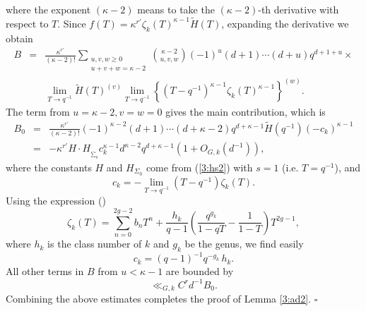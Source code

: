 \documentclass[12pt]{amsart}
\theoremstyle{plain}
\begin{document}
where the exponent $(\kappa-2)$ means to take the $(\kappa-2)$-th derivative with respect to $T$. Since $f(T)=\kappa^{r'} \zeta_k(T)^{\kappa-1} \widetilde{H}(T)$, expanding the derivative we obtain
\begin{eqnarray*} B&=&\frac{\kappa^{r'}}{(\kappa-2)!} \sum_{\substack{u,v,w \ge 0\\
u+v+w=\kappa-2}} \binom{\kappa-2}{u,v,w}(-1)^u(d+1) \cdots (d+u) q^{d+1+u} \times \\
&&\lim_{T \to q^{-1}}\widetilde{H}(T)^{(v)} \lim_{T \to q^{-1}} \left\{ (T-q^{-1})^{\kappa-1} \zeta_k(T)^{\kappa-1} \right\}^{(w)}. \end{eqnarray*}
The term from $u=\kappa-2,v=w=0$ gives the main contribution, which is
\begin{eqnarray*} B_0 &=& \frac{\kappa^{r'}}{(\kappa-2)!} (-1)^{\kappa-2}(d+1) \cdots (d+\kappa-2) q^{d+\kappa-1} \widetilde{H}(q^{-1}) (-c_k)^{\kappa-1}\\
&=& -\kappa^{r'} H \cdot H_{_{\sum_0}}c_k^{\kappa-1} d^{\kappa-2} q^{d+\kappa-1}\left(1+O_{G,k}(d^{-1})\right), \end{eqnarray*}
where the constants $H$ and $H_{\Sigma_0}$ come from (\ref{3:hs2}) with $s=1$ (i.e. $T=q^{-1}$), and
\[c_k=-\lim_{T \to q^{-1}} (T-q^{-1}) \zeta_k(T). \]
Using the expression (\cite[Theorem 5.9, page 53]{ros})
\[\zeta_k(T)=\sum_{n=0}^{2g-2} b_nT^n+ \frac{h_k}{q-1}\left(\frac{q^{g_k}}{1-qT}-\frac{1}{1-T}\right)
T^{2g-1},\]
where $h_k$ is the class number of $k$ and $g_k$ be the genus, we find easily
\[c_k=(q-1)^{-1}q^{-g_k}\, h_k.\]
All other terms in $B$ from $u <\kappa-1$ are bounded by
\[\ll_{G,k} C^r d^{-1}B_0.  \]
Combining the above estimates completes the proof of Lemma \ref{3:ad2}. \quad $\square$
\end{document}
